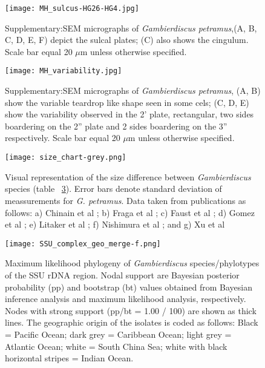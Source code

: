 \documentclass[12pt]{article}
\begin{document}
\FloatBarrier 
\begin{figure} 
\texttt{[image: MH\_sulcus-HG26-HG4.jpg]} 
\caption{Supplementary:SEM micrographs of \emph{Gambierdiscus petramus},(A, B, C, D, E, F) depict the sulcal plates; (C) also shows the cingulum. Scale bar equal 20 $\mu$m unless otherwise specified.} 
\label{fig:sulcSEM}
\end{figure} 
\FloatBarrier
\FloatBarrier 
\begin{figure} 
\texttt{[image: MH\_variability.jpg]} 
\caption{Supplementary:SEM micrographs of \emph{Gambierdiscus petramus}, (A, B) show the variable teardrop like shape seen in some cels; (C, D, E) show the variability observed in the 2' plate, rectangular, two sides boardering on the 2'' plate and 2 sides boardering on the 3'' respectively. Scale bar equal 20 $\mu$m unless otherwise specified.} 
\label{fig:varSEM}
\end{figure} 
\FloatBarrier

\FloatBarrier 
\begin{figure} 
\texttt{[image: size\_chart-grey.png]} 
\caption{Visual representation of the size difference between \emph{Gambierdiscus} species (table ~\ref{fig:SizeGraph}). Error bars denote standard deviation of meassurements for \emph{G. petramus}. Data taken from publications as follows: a) Chinain et al \citep{chinain1999morphology}; b) Fraga et al \citep{fraga2014genus}; c) Faust et al \citep{faust1995observation}; d) Gomez et al \citep{gomez2015fukuyoa}; e) Litaker et al \citep{litaker2009taxonomy}; f) Nishimura et al \citep{nishimura2014morphology}; and g) Xu et al \citep{xu2014distribution}} 
\label{fig:SizeGraph}
\end{figure} 
\FloatBarrier 

\begin{figure} 
\texttt{[image: SSU\_complex\_geo\_merge-f.png]} 
\caption{Maximum likelihood phylogeny of \textit{Gambierdiscus} species/phylotypes of the SSU rDNA region. Nodal support are Bayesian posterior probability (pp) and bootstrap (bt) values obtained from Bayesian inference analysis and maximum likelihood analysis, respectively. Nodes with strong support (pp/bt = 1.00 / 100) are shown as thick lines. The geographic origin of the isolates is coded as follows: Black = Pacific Ocean; dark grey = Caribbean Ocean; light grey = Atlantic Ocean; white = South China Sea; white with black horizontal stripes = Indian Ocean.}
\label{fig:HGSSU} 
\end{figure} 
\FloatBarrier 
\end{document}
